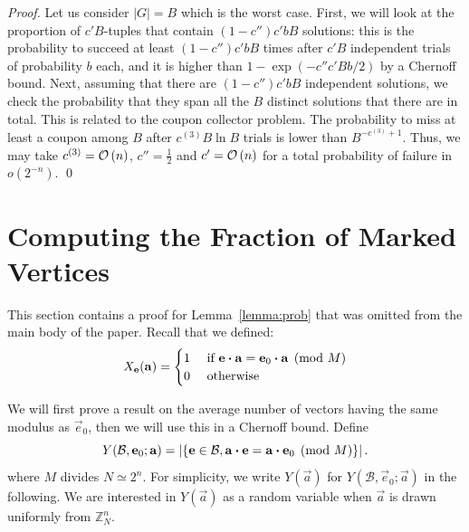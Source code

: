 \begin{proof}
Let us consider $|G| = B$ which is the worst case.  First, we will look at the proportion of $c'B$-tuples that contain $(1- c'')c' b B$ solutions: this is the probability to succeed at least $(1- c'')c' b B$ times after $c' B$ independent trials of probability $b$ each, and it is higher than $1 - \exp(-c'' c' B b / 2)$ by a Chernoff bound. Next, assuming that there are $(1- c'')c' b B$ independent solutions, we check the probability that they span all the $B$ distinct solutions that there are in total. This is related to the coupon collector problem. The probability to miss at least a coupon among $B$ after $c^{(3)} B \ln B$ trials is lower than $B^{-c^{(3)} + 1}$. Thus, we may take $c^{(3)} = \mathcal{O} \left(n \right)$, $c'' = \frac{1}{2}$ and $c' = \mathcal{O} \left(n \right)$ for a total probability of failure in $o(2^{-n})$. \qed
\end{proof}




\section{Computing the Fraction of Marked Vertices}
\label{appendix:probas}

This section contains a proof for Lemma~\ref{lemma:prob} that was omitted from the main body of the paper. Recall that we defined:
$$X_{\mathbf{e}}(\mathbf{a})= \begin{cases}
  1 & \text{ if } \mathbf{e}\boldsymbol{\cdot} \mathbf{a} = \mathbf{e}_0 \boldsymbol{\cdot} \mathbf{a} \pmod M\\
  0 & \text{ otherwise}
\end{cases}$$

We will first prove a result on the average number of vectors having the same modulus as $\vec{e}_0$, then we will use this in a Chernoff bound. Define
\[
    Y(\mathcal{B},\mathbf{e}_0;\mathbf{a})=
        \left|\{\mathbf{e}\in\mathcal{B}, \mathbf{a}\boldsymbol{\cdot}\mathbf{e}=\mathbf{a}\boldsymbol{\cdot}\mathbf{e}_0\pmod{M}\}\right|.
\]
where $M$ divides $N \simeq 2^n$. For simplicity, we write $Y(\vec{a})$ for $Y(\mathcal{B},\vec{e}_0;\vec{a})$ in the following. We are interested in $Y(\vec{a})$ as a random variable when $\vec{a}$ is drawn uniformly from $\mathbb{Z}_{N}^n$. 

%

